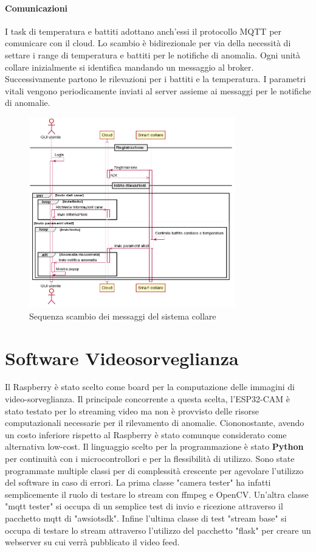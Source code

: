 \paragraph{Comunicazioni}
    I task di temperatura e battiti adottano anch'essi il protocollo MQTT per comunicare con il cloud. Lo scambio è bidirezionale per via della necessità di settare i range di temperatura e battiti per le notifiche di anomalia.
    Ogni unità collare inizialmente si identifica mandando un messaggio al broker. Successivamente partono le rilevazioni per i battiti e la temperatura. I parametri vitali vengono periodicamente inviati al server assieme ai messaggi per le notifiche di anomalie.
    \begin{figure}[H]
        \caption{Sequenza scambio dei messaggi del sistema collare}
        \label{fig:sequencesmartcollar}
        \centering
        \includegraphics[width=0.8\textwidth]{DrawIo/sequenceSmartCollar.png}
    \end{figure}
    
\section{Software Videosorveglianza}
Il Raspberry è stato scelto come board per la computazione delle immagini di video-sorveglianza. Il principale concorrente a questa scelta, l'ESP32-CAM è stato testato per lo streaming video ma non è provvisto delle risorse computazionali necessarie per il rilevamento di anomalie. 
Ciononostante, avendo un costo inferiore rispetto al Raspberry è stato comunque considerato come alternativa low-cost. 
Il linguaggio scelto per la programmazione è stato \textbf{Python} per continuità con i microcontrollori e per la flessibilità di utilizzo. 
Sono state programmate multiple classi per di complessità crescente per agevolare l'utilizzo del software in caso di errori.
La prima classe "camera tester" ha infatti semplicemente il ruolo di testare lo stream con ffmpeg e OpenCV.
Un'altra classe "mqtt tester" si occupa di un semplice test di invio e ricezione attraverso il pacchetto mqtt di "awsiotsdk". 
Infine l'ultima classe di test "stream base" si occupa di testare lo stream attraverso l'utilizzo del pacchetto "flask" per creare un webserver su cui verrà pubblicato il video feed.

